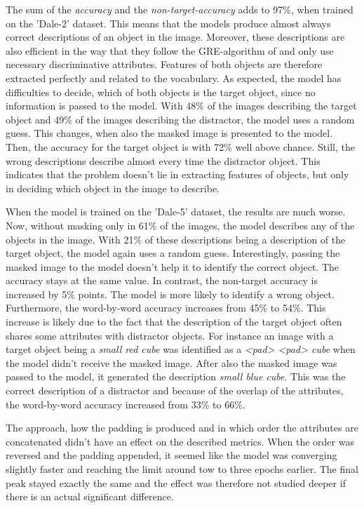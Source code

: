 The sum of the \emph{accuracy} and the \emph{non-target-accuracy} adds to 97\%, when trained on the 'Dale-2' dataset.
This means that the models produce almost always correct descriptions of an object in the image.
Moreover, these descriptions are also efficient in the way that they follow the GRE-algorithm of \citet{Dale1995} and only use necessary discriminative attributes.
Features of both objects are therefore extracted perfectly and related to the vocabulary.
As expected, the model has difficulties to decide, which of both objects is the target object, since no information is passed to the model.
With 48\% of the images describing the target object and 49\% of the images describing the distractor, the model uses a random guess.
This changes, when also the masked image is presented to the model.
Then, the accuracy for the target object is with 72\% well above chance.
Still, the wrong descriptions describe almost every time the distractor object.
This indicates that the problem doesn't lie in extracting features of objects, but only in deciding which object in the image to describe.

When the model is trained on the 'Dale-5' dataset, the results are much worse.
Now, without masking only in 61\% of the images, the model describes any of the objects in the image.
With 21\% of these descriptions being a description of the target object, the model again uses a random guess.
Interestingly, passing the masked image to the model doesn't help it to identify the correct object.
The accuracy stays at the same value.
In contrast, the non-target accuracy is increased by 5\% points.
The model is more likely to identify a wrong object.
Furthermore, the word-by-word accuracy increases from 45\% to 54\%.
This increase is likely due to the fact that the description of the target object often shares some attributes with distractor objects.
For instance an image with a target object being a \emph{small red cube} was identified as a \emph{<pad> <pad> cube} when the model didn't receive the masked image.
After also the masked image was passed to the model, it generated the description \emph{small blue cube}.
This was the correct description of a distractor and because of the overlap of the attributes, the word-by-word accuracy increased from 33\% to 66\%.

The approach, how the padding is produced and in which order the attributes are concatenated didn't have an effect on the described metrics.
When the order was reversed and the padding appended, it seemed like the model was converging slightly faster and reaching the limit around tow to three epochs earlier.
The final peak stayed exactly the same and the effect was therefore not studied deeper if there is an actual significant difference.

